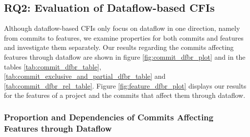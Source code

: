 \subsection*{\textbf{RQ2: Evaluation of Dataflow-based CFIs}}\label{sec:eval_df_cfis}

Although dataflow-based CFIs only focus on dataflow in one direction, namely from commits to features, we examine properties for both commits and features and investigate them separately.
Our results regarding the commits affecting features through dataflow are shown in figure \ref{fig:commit_dfbr_plot} and in the tables \ref{tab:commit_dfbr_table}, \ref{tab:commit_exclusive_and_partial_dfbr_table} and \ref{tab:commit_dfbr_rel_table}.
Figure \ref{fig:feature_dfbr_plot} displays our results for the features of a project and the commits that affect them through dataflow.

\subsubsection*{Proportion and Dependencies of Commits Affecting Features through Dataflow}\label{sec:eval_commit_dfbr}


